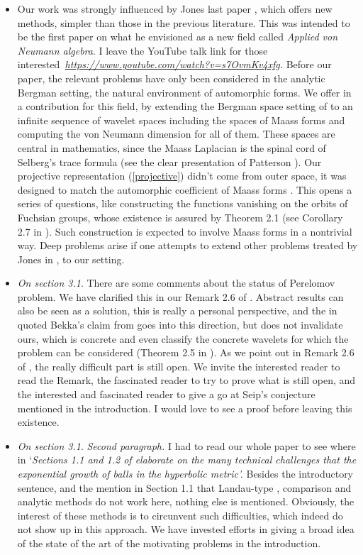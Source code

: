 \documentclass[11pt,reqno]{amsart}
\numberwithin{equation}{section}
\theoremstyle{plain}
\theoremstyle{definition}
\theoremstyle{remark}
\begin{document}
\begin{itemize}
\item Our work was strongly influenced by Jones last paper \cite{Jones},
which offers new methods, simpler than those in the previous literature.
This was intended to be the first paper on what he envisioned as a new field
called \emph{Applied von Neumann algebra}. I leave the YouTube talk link for
those interested\emph{\ \url{https://www.youtube.com/watch?v=s7OvmKv4xfg}. }%
Before our paper, the relevant problems have only been considered in the
analytic Bergman setting, the natural environment of automorphic forms. We
offer in \cite{Affine} a contribution for this field, by extending the
Bergman space setting of \cite{Jones} to an infinite sequence of wavelet
spaces including the spaces of Maass forms and computing the von Neumann
dimension for all of them. These spaces are central in mathematics, since
the Maass Laplacian is the spinal cord of Selberg's trace formula (see the
clear presentation of Patterson \cite{Patterson}). Our projective
representation (\ref{projective}) didn't come from outer space, it was
designed to match the automorphic coefficient of Maass forms \cite%
{Duke,Maass}. This opens a series of questions, like constructing the
functions vanishing on the orbits of Fuchsian groups, whose existence is
assured by Theorem 2.1 (see Corollary 2.7 in \cite{Affine}). Such
construction is expected to involve Maass forms in a nontrivial way. Deep
problems arise if one attempts to extend other problems treated by Jones in 
\cite{Jones}, to our setting.

\item \emph{On section 3.1}. There are some comments about the status of
Perelomov problem. We have clarified this in our Remark 2.6 of \cite{Affine}%
. Abstract results can also be seen as a solution, this is really a personal
perspective, and the in \cite{Letter} quoted Bekka's claim from \cite{Bekka}
goes into this direction, but does not invalidate ours, which is concrete
and even classify the concrete wavelets for which the problem can be
considered (Theorem 2.5 in \cite{Affine}). As we point out in Remark 2.6 of 
\cite{Affine}, the really difficult part is still open. We invite the
interested reader to read the Remark, the fascinated reader to try to prove
what is still open, and the interested and fascinated reader to give a go at
Seip's conjecture mentioned in the introduction. I would love to see a proof
before leaving this existence.

\item \emph{On section 3.1}. \emph{Second paragraph. }I had to read our
whole paper to see where in `\emph{Sections 1.1 and 1.2 of \cite{Affine}
elaborate on the many technical challenges that the exponential growth of
balls in the hyperbolic metric'.} Besides the introductory sentence, and the
mention in Section 1.1 that Landau-type \cite{Landau,Mirko}, comparison \cite%
{HK} and analytic \cite{Seip} methods do not work here, nothing else is
mentioned. Obviously, the interest of these methods is to circunvent such
difficulties, which indeed do not show up in this approach. We have invested
efforts in giving a broad idea of the state of the art of the motivating
problems in the introduction.


\end{itemize}
\end{document}
